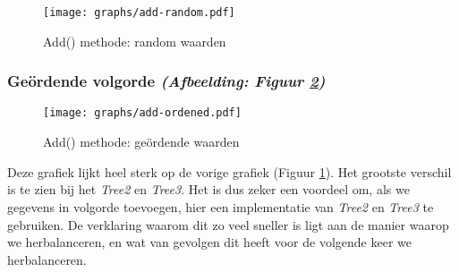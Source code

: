 \documentclass[11pt,a4paper]{report}
\begin{document}
\begin{figure}[h!]
	\texttt{[image: graphs/add-random.pdf]}
	\caption{Add() methode: random waarden}
	\label{add-random}
\end{figure}

\subsubsection{Ge\"ordende volgorde \textsl{(Afbeelding: Figuur \ref{add-ordened})}}
\begin{figure}[h!]
	\texttt{[image: graphs/add-ordened.pdf]}
	\caption{Add() methode: ge\"ordende waarden}
	\label{add-ordened}
\end{figure}
Deze grafiek lijkt heel sterk op de vorige grafiek (Figuur \ref{add-random}). Het grootste verschil is te zien bij het \textsl{Tree2} en \textsl{Tree3}. Het is dus zeker een voordeel om, als we gegevens in volgorde toevoegen, hier een implementatie van \textsl{Tree2} en \textsl{Tree3} te gebruiken. De verklaring waarom dit zo veel sneller is ligt aan de manier waarop we herbalanceren, en wat van gevolgen dit heeft voor de volgende keer we herbalanceren.
\end{document}

